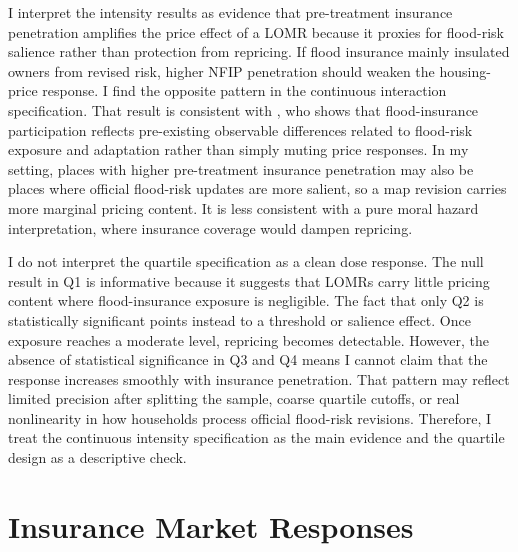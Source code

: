 \documentclass[12pt]{article}
\begin{document}
I interpret the intensity results as evidence that pre-treatment insurance penetration amplifies the price effect of a LOMR because it proxies for flood-risk salience rather than protection from repricing. If flood insurance mainly insulated owners from revised risk, higher NFIP penetration should weaken the housing-price response. I find the opposite pattern in the continuous interaction specification. That result is consistent with \citet{Wagner2022}, who shows that flood-insurance participation reflects pre-existing observable differences related to flood-risk exposure and adaptation rather than simply muting price responses. In my setting, places with higher pre-treatment insurance penetration may also be places where official flood-risk updates are more salient, so a map revision carries more marginal pricing content. It is less consistent with a pure moral hazard interpretation, where insurance coverage would dampen repricing.

I do not interpret the quartile specification as a clean dose response. The null result in Q1 is informative because it suggests that LOMRs carry little pricing content where flood-insurance exposure is negligible. The fact that only Q2 is statistically significant points instead to a threshold or salience effect. Once exposure reaches a moderate level, repricing becomes detectable. However, the absence of statistical significance in Q3 and Q4 means I cannot claim that the response increases smoothly with insurance penetration. That pattern may reflect limited precision after splitting the sample, coarse quartile cutoffs, or real nonlinearity in how households process official flood-risk revisions. Therefore, I treat the continuous intensity specification as the main evidence and the quartile design as a descriptive check.
\FloatBarrier


\section{Insurance Market Responses}\label{sec:insurance}
\end{document}

